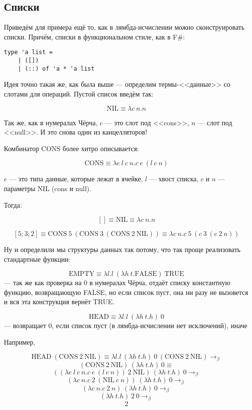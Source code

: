 \documentclass[a5paper]{article}
\begin{document}
\subsection{Списки}

Приведём для примера ещё то, как в лямбда-исчислении можно сконструировать списки. Причём, списки в функциональном стиле, как в F\#:

\begin{verbatim}
type 'a list =
    | ([])
    | (::) of 'a * 'a list
\end{verbatim}

Идея точно такая же, как была выше --- определим термы-<<данные>> со слотами для операций. Пустой список введём так:

$$\mbox{NIL} \equiv \lambda c\ n.n$$

Так же, как в нумералах Чёрча, $c$ --- это слот под <<cons>>, $n$ --- слот под <<null>>. И это снова один из канцелляторов!

Комбинатор $\mbox{CONS}$ более хитро описывается: 

$$\mbox{CONS} \equiv \lambda e\ l\ c\ n.c\ e\ (l\ c\ n)$$

$e$ --- это типа данные, которые лежат в ячейке, $l$ --- хвост списка, $c$ и $n$ --- параметры NIL (cons и null).

Тогда:

$$[] \equiv \mbox{NIL} \equiv \lambda c\ n.n$$

$$[5; 3; 2] \equiv \mbox{CONS}\ 5\ (\mbox{CONS}\ 3\ (\mbox{CONS}\ 2\ \mbox{NIL})) \equiv \lambda c\ n.c\ 5\ (c\ 3\ (c\ 2\ n))$$

Ну и определили мы структуры данных так потому, что так проще реализовать стандартные функции:

$$\mbox{EMPTY} \equiv \lambda l.l\ (\lambda h\ t.\mbox{FALSE})\ \mbox{TRUE}$$
--- так же как проверка на 0 в нумералах Чёрча, отдаёт списку константную функцию, возвращающую FALSE, но если список пуст, она ни разу не вызовется и вся эта конструкция вернёт TRUE.

$$\mbox{HEAD} \equiv \lambda l.l\ (\lambda h\ t.h)\ 0$$
--- возвращает 0, если список пуст (в лямбда-исчислении нет исключений), иначе 

Например,

$$\mbox{HEAD}\ (\mbox{CONS}\ 2\ \mbox{NIL}) \equiv \lambda l.l\ (\lambda h\ t.h)\ 0\ (\mbox{CONS}\ 2\ \mbox{NIL}) \rightarrow_\beta$$
$$    (\mbox{CONS}\ 2\ \mbox{NIL})\ (\lambda h\ t.h)\ 0 \equiv$$
$$    ((\lambda e\ l\ c\ n.c\ e\ (l\ c\ n))\ 2\ \mbox{NIL})\ (\lambda h\ t.h)\ 0 \rightarrow_\beta$$
$$    (\lambda c\ n.c\ 2\ (\mbox{NIL}\ c\ n))\ (\lambda h\ t.h)\ 0 \rightarrow_\beta$$
$$    (\lambda c\ n.c\ 2\ n)\ (\lambda h\ t.h)\ 0 \rightarrow_\beta$$
$$    (\lambda h\ t.h)\ 2\ 0 \rightarrow_\beta$$
$$    2$$
\end{document}
